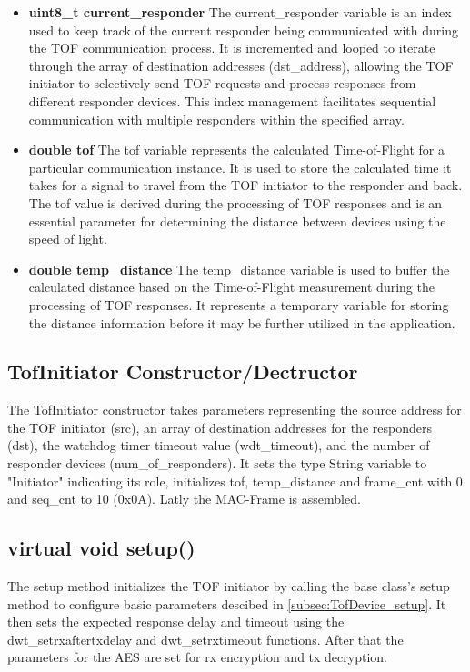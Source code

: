 \begin{itemize}
	\item \textbf{uint8\_t current\_responder}
	\newline
	The current\_responder variable is an index used to keep track of the current responder being communicated with during the TOF communication process. 
	It is incremented and looped to iterate through the array of destination addresses (dst\_address), allowing the TOF initiator to selectively send TOF requests and process responses from different responder devices. 
	This index management facilitates sequential communication with multiple responders within the specified array.
	
	\item \textbf{double tof}
	\newline
	The tof variable represents the calculated Time-of-Flight for a particular communication instance. 
	It is used to store the calculated time it takes for a signal to travel from the TOF initiator to the responder and back. 
	The tof value is derived during the processing of TOF responses and is an essential parameter for determining the distance between devices using the speed of light.
	
	\item \textbf{double temp\_distance}
	\newline
	The temp\_distance variable is used to buffer the calculated distance based on the Time-of-Flight measurement during the processing of TOF responses. 
	It represents a temporary variable for storing the distance information before it may be further utilized in the application. 
\end{itemize}

\subsection{TofInitiator Constructor/Dectructor}
\label{subsec:TofInitiator_Constructor}
The TofInitiator constructor takes parameters representing the source address for the TOF initiator (src), an array of destination addresses for the responders (dst), the watchdog timer timeout value (wdt\_timeout), and the number of responder devices (num\_of\_responders). 
It sets the type String variable to "Initiator" indicating its role, initializes tof, temp\_distance and frame\_cnt with 0 and seq\_cnt to 10 (0x0A). 
Latly the MAC-Frame is assembled. 

\subsection{virtual void setup()}
\label{subsec:TofInitiator_setup}
The setup method initializes the TOF initiator by calling the base class's setup method to configure basic parameters descibed in \ref{subsec:TofDevice_setup}. 
It then sets the expected response delay and timeout using the dwt\_setrxaftertxdelay and dwt\_setrxtimeout functions. 
After that the parameters for the AES are set for rx encryption and tx decryption. 

